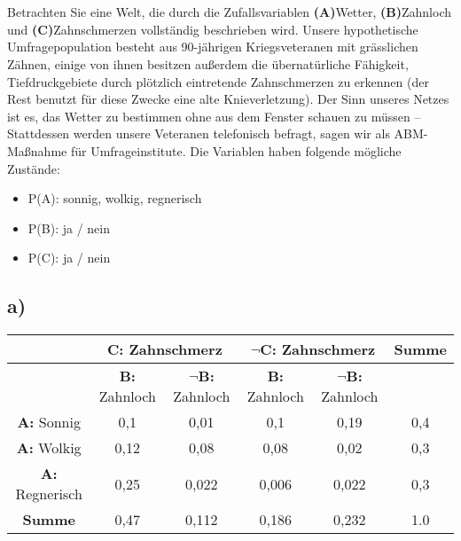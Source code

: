 \documentclass[12pt, a4paper]{article}
\begin{document}
\maketitle
\newpage
\section{}
Betrachten Sie eine Welt, die durch die Zufallsvariablen \textbf{(A)}Wetter, \textbf{(B)}Zahnloch und \textbf{(C)}Zahnschmerzen vollständig beschrieben wird. Unsere hypothetische Umfragepopulation besteht aus 90-jährigen Kriegsveteranen mit grässlichen Zähnen, einige von ihnen besitzen außerdem die übernatürliche Fähigkeit, Tiefdruckgebiete durch plötzlich eintretende Zahnschmerzen zu erkennen (der Rest benutzt für diese Zwecke eine alte Knieverletzung). Der Sinn unseres Netzes ist es, das Wetter zu bestimmen ohne aus dem Fenster schauen zu müssen – Stattdessen werden unsere Veteranen telefonisch befragt, sagen wir als ABM-Maßnahme für Umfrageinstitute.
Die Variablen haben folgende mögliche Zustände:
\begin{itemize}
\item P(A): sonnig, wolkig, regnerisch
\item P(B): ja / nein
\item P(C): ja / nein
\end{itemize}

\subsection*{a)}

\begin{tabular}[bct]{|c|c|c|c|c|c|}
\hline \bigstrut
& \multicolumn{2}{|c|}{\textbf{C:} Zahnschmerz } & \multicolumn{2}{|c|}{\textbf{$\neg$C}: Zahnschmerz } & \textbf{Summe} \\
\hline \bigstrut
& \textbf{B:} Zahnloch & \textbf{$\neg$B:} Zahnloch & \textbf{B:} Zahnloch & \textbf{$\neg$B:} Zahnloch & \\
\hline \bigstrut
\textbf{A:} Sonnig & 0,1 & 0,01 & 0,1 & 0,19 & 0,4 \\ 
\hline \bigstrut
\textbf{A:} Wolkig & 0,12 & 0,08 & 0,08 & 0,02 & 0,3 \\ 
\hline \bigstrut
\textbf{A:} Regnerisch & 0,25 & 0,022 & 0,006 & 0,022 & 0,3 \\ 
\hline \bigstrut
\textbf{Summe} & 0,47 & 0,112 & 0,186 & 0,232 & 1.0 \\ 
\hline
\end{tabular}
\end{document}
